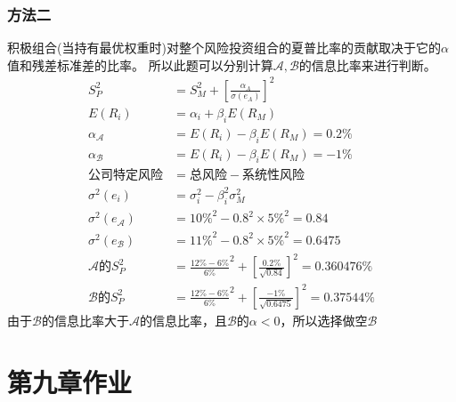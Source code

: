 \documentclass{article}
\begin{document}
\subsubsection*{方法二}
积极组合(当持有最优权重时)对整个风险投资组合的夏普比率的贡献取决于它的$\alpha$值和残差标准差的比率。
所以此题可以分别计算$\mathcal{A} ,\mathcal{B} $的信息比率来进行判断。
\begin{align}
    S_P^2&=S_M^2+{[\frac{\alpha_A}{\sigma(e_A)}]}^2\\
    E(R_i)&=\alpha_i+\beta_iE(R_M)\\
    \alpha_\mathcal{A} &=E(R_i)-\beta_iE(R_M)=0.2\%\\
    \alpha_\mathcal{B} &=E(R_i)-\beta_iE(R_M)=-1\%\\
    \text{公司特定风险}&=\text{总风险}-\text{系统性风险}\\
    \sigma^2(e_i)&=\sigma_i^2-\beta_i^2\sigma_M^2\\
    \sigma^2(e_\mathcal{A} )&=10\%^2-0.8^2\times 5\%^2=0.84\\
    \sigma^2(e_\mathcal{B} )&=11\%^2-0.8^2\times 5\%^2=0.6475\\
    \mathcal{A} \text{的}S_P^2&={\frac{12\%-6\%}{6\%}}^2+{[\frac{0.2\%}{\sqrt{0.84}}]}^2=0.360476\%\\
    \mathcal{B} \text{的}S_P^2&={\frac{12\%-6\%}{6\%}}^2+{[\frac{-1\%}{\sqrt{0.6475}}]}^2=0.37544\%
\end{align}
由于$\mathcal{B} $的信息比率大于$\mathcal{A} $的信息比率，且$\mathcal{B} $的$\alpha<0$，所以选择做空$\mathcal{B} $
\clearpage
\section*{\center 第九章作业}
\end{document}
